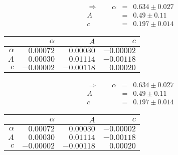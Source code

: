 \begin{align}\Rightarrow \qquad
    \alpha &=& 0.634 \pm 0.027 \\
    A &=& 0.49 \pm 0.11 \\
    c &=& 0.197 \pm 0.014 
\end{align}

 \begin{tabular}{|r|r|r|r|}
 \hline 
\cellcolor{tabcolor}&\cellcolor{tabcolor}$\alpha$&\cellcolor{tabcolor}$A$&\cellcolor{tabcolor}$c$\\ \hline 
 \cellcolor{tabcolor}$\alpha$&$0.00072$ &$0.00030$ &$-0.00002$ \\ \hline
\cellcolor{tabcolor}$A$&$0.00030$ &$0.01114$ &$-0.00118$ \\ \hline
\cellcolor{tabcolor}$c$&$-0.00002$ &$-0.00118$ &$0.00020$ \\ \hline
\end{tabular}
\begin{align}\Rightarrow \qquad
    \alpha &=& 0.634 \pm 0.027 \\
    A &=& 0.49 \pm 0.11 \\
    c &=& 0.197 \pm 0.014 
\end{align}

 \begin{tabular}{|r|r|r|r|}
 \hline 
\cellcolor{tabcolor}&\cellcolor{tabcolor}$\alpha$&\cellcolor{tabcolor}$A$&\cellcolor{tabcolor}$c$\\ \hline 
 \cellcolor{tabcolor}$\alpha$&$0.00072$ &$0.00030$ &$-0.00002$ \\ \hline
\cellcolor{tabcolor}$A$&$0.00030$ &$0.01114$ &$-0.00118$ \\ \hline
\cellcolor{tabcolor}$c$&$-0.00002$ &$-0.00118$ &$0.00020$ \\ \hline
\end{tabular}
